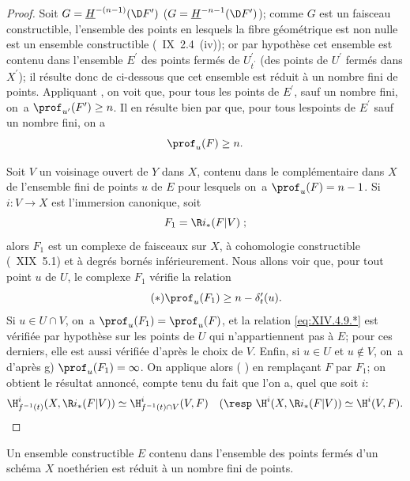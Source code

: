 \begin{proof}
Soit $G=\underline{H}^{-(n-1)}(\D F^{\prime})$ (\resp $G=\underline{H}^{-n-1}(\D F^{\prime})$); comme $G$ est un faisceau constructible, l'ensemble des points en lesquels la fibre g\'eom\'etrique est non nulle est un ensemble constructible (~IX~2.4~\textup{(iv)}); or par hypoth\`ese cet ensemble est contenu dans l'ensemble $E^{\prime}$ des points ferm\'es de $U_{t^{\prime}}^{\prime}$ (\resp des points de $U^{\prime}$ ferm\'es dans $X^{\prime}$); il r\'esulte donc de  ci-dessous que cet ensemble est r\'eduit \`a un nombre fini de points. Appliquant , on voit que, pour tous les points de $E^{\prime}$, sauf un nombre fini, on~a $\prof_{u^{\prime}}(F^{\prime})\geq n$. Il en r\'esulte bien par  que, pour tous les\pageoriginale points de $E^{\prime}$ sauf un nombre fini, on a
$$
\prof_{u}(F)\geq n.
$$

Soit $V$ un voisinage ouvert de $Y$ dans $X$, contenu dans le compl\'ementaire dans $X$ de l'ensemble fini de points $u$ de $E$ pour lesquels on~a $\prof_{u}(F)=n-1$. Si $i\colon V\to X$ est l'immersion canonique, soit
$$F_{1}=\R i_{\ast}(F{|V})\;;$$
alors $F_{1}$ est un complexe de faisceaux sur $X$, \`a cohomologie constructible (~XIX~5.1) et \`a degr\'es born\'es inf\'erieurement. Nous allons voir que, pour tout point $u$ de $U$, le complexe $F_{1}$ v\'erifie la relation
\begin{equation*} \label{eq:XIV.4.9.*} \tag{$*$}
\prof_{u}(F_{1})\geq n-\delta_{t}^{\prime}(u).
\end{equation*}
Si $u\in U\cap V$, on~a $\prof_{u}(F_{1})=\prof_{u}(F)$, et la
relation \eqref{eq:XIV.4.9.*} est v\'erifi\'ee par hypoth\`ese sur les
points de $U$ qui n'appartiennent pas \`a $E$; pour ces derniers,
elle est aussi v\'erifi\'ee d'apr\`es le choix de $V$. Enfin, si $u\in
U$ et $u\not\in V$, on~a d'apr\`es  g)
$\prof_{u}(F_{1})=\infty$. On applique alors  (\resp
{}) en rempla\c cant $F$ par $F_{1}$; on obtient le
r\'esultat annonc\'e, compte tenu du fait que l'on a, quel que soit
$i$:
$$
\H_{f^{-1}(t)}^{i}(X, \R i_{\ast}(F{|V}))\simeq\H_{f^{-1}(t)\cap V}^{i}(V, F)\quad(\textrm{\resp }\H^{i}(X, \R i_{\ast}(F{|V}))\simeq\H^{i}(V, F).
$$
\skipqed
\end{proof}

\begin{sublemme} \label{XIV.4.9.1} Un ensemble constructible $E$ contenu dans l'ensemble des points ferm\'es d'un sch\'ema $X$ noeth\'erien est r\'eduit \`a un nombre fini de points\pageoriginale.
\end{sublemme}

